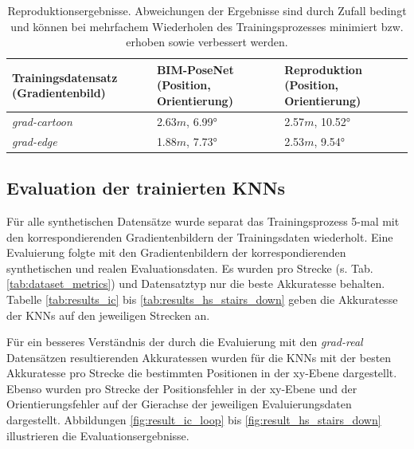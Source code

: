 \begin{table}[b]
	\centering
	\caption{Reproduktionsergebnisse. Abweichungen der Ergebnisse sind durch Zufall bedingt und können bei mehrfachem Wiederholen des Trainingsprozesses minimiert bzw. erhoben sowie verbessert werden. }
	\begin{tabularx}{1.0\textwidth}{X X X}
		\textbf{Trainingsdatensatz} \hspace{2cm} (Gradientenbild) & \textbf{BIM-PoseNet} \hspace{2cm} (Position, Orientierung) & \textbf{Reproduktion} \hspace{2cm} (Position, Orientierung)\\
		\hline
	 \textit{grad-cartoon} & 2.63$m$, 6.99° & 2.57$m$, 10.52°\\
		\hline
		\textit{grad-edge} & 1.88$m$, 7.73°  & 2.53$m$, 9.54°\\
	\end{tabularx}
	\label{tab:reproduction}
\end{table}





\subsection{Evaluation der trainierten KNNs}
Für alle synthetischen Datensätze wurde separat das Trainingsprozess 5-mal mit den korrespondierenden Gradientenbildern der Trainingsdaten wiederholt. Eine Evaluierung folgte mit den Gradientenbildern der korrespondierenden synthetischen und realen Evaluationsdaten. Es wurden pro Strecke (s. Tab. \ref{tab:dataset_metrics}) und Datensatztyp nur die beste Akkuratesse behalten. Tabelle \ref{tab:results_ic} bis \ref{tab:results_hs_stairs_down} geben die Akkuratesse der KNNs auf den jeweiligen Strecken an. 

Für ein besseres Verständnis der durch die Evaluierung mit den \textit{grad-real} Datensätzen resultierenden Akkuratessen wurden für die KNNs mit der besten Akkuratesse pro Strecke die bestimmten Positionen in der xy-Ebene dargestellt. Ebenso wurden pro Strecke der Positionsfehler in der xy-Ebene und der Orientierungsfehler auf der Gierachse der jeweiligen Evaluierungsdaten dargestellt. Abbildungen \ref{fig:result_ic_loop} bis \ref{fig:result_hs_stairs_down} illustrieren die Evaluationsergebnisse.


